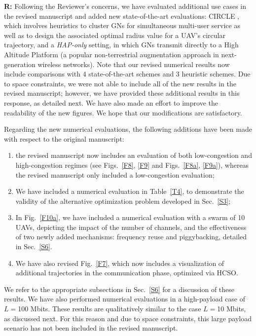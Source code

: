 \documentclass[12pt, draftcls, onecolumn]{IEEEtran}
\theoremstyle{plain}
\theoremstyle{definition}
\theoremstyle{remark}
\begin{document}
\begin{enumerate}
    \textbf{R:} Following the Reviewer's concerns, we have evaluated additional use cases in the revised manuscript and added new state-of-the-art evaluations:
    CIRCLE \cite{MEC-DDPG}, which involves heuristics to cluster GNs for simultaneous multi-user service as well as to design the associated optimal radius value for a UAV's circular trajectory,
    and a \emph{HAP-only} setting, in which GNs transmit directly to a High Altitude Platform (a popular non-terrestrial augmentation approach in next-generation wireless networks). Note that our revised numerical results now include comparisons with 4 state-of-the-art schemes and 3 heuristic schemes. Due to space constraints, we were not able to include all of the new results in the revised manuscript; however, we have provided these additional results in this response, as detailed next. We have also made an effort to improve the readability of the new figures. We hope that our modifications are satisfactory.
    \vspace{2mm}

Regarding the new numerical evaluations, the following additions have been made with respect to the original manuscript:
\begin{enumerate}
    \item 
the revised manuscript now includes an evaluation of both low-congestion and high-congestion regimes (see Figs.~\ref{F8}, \ref{F9} and Figs.~\ref{F8a}, \ref{F9a}), whereas the revised manuscript only included a low-congestion evaluation;
\item We have included a numerical evaluation in Table~\ref{T4}, to demonstrate the validity of the alternative optimization problem developed in Sec.~\ref{S3};
\item In Fig.~\ref{F10a}, we have included a numerical evaluation with a swarm of 10 UAVs, depicting the impact of the number of channels, and the effectiveness of two newly added mechanisms: frequency reuse and piggybacking, detailed in Sec.~\ref{S6}.
\item We have also revised Fig.~\ref{F7}, which now includes a visualization of
    additional trajectories in the communication phase, optimized via HCSO.
\end{enumerate}
We refer to the appropriate subsections in Sec.~\ref{S6} for a discussion of these results.
    We have also performed numerical evaluations in a high-payload case of 
    $L{=}$100 Mbits. These results are qualitatively similar to the case $L{=}$10 Mbits, as discussed next. For this reason and due to space constraints,
    this large payload scenario has not been included in the revised manuscript.


\end{enumerate}
\end{document}
